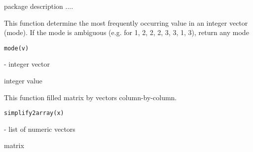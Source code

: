 \documentclass[letterpaper]{book}
\begin{document}
%
\begin{Description}\relax
package description ....
\end{Description}
%
\begin{Description}\relax
This function determine the most frequently occurring value in an integer vector (mode). If the mode is ambiguous (e.g. for 1, 2, 2, 2, 3, 3, 1, 3), return any mode
\end{Description}
%
\begin{Usage}
\begin{verbatim}
mode(v)
\end{verbatim}
\end{Usage}
%
\begin{Arguments}
\begin{ldescription}
\item[\code{v}] - integer vector
\end{ldescription}
\end{Arguments}
%
\begin{Value}
integer value
\end{Value}
%
\begin{Description}\relax
This function filled  matrix by vectors column-by-column.
\end{Description}
%
\begin{Usage}
\begin{verbatim}
simplify2array(x)
\end{verbatim}
\end{Usage}
%
\begin{Arguments}
\begin{ldescription}
\item[\code{x}] - list of numeric vectors
\end{ldescription}
\end{Arguments}
%
\begin{Value}
matrix
\end{Value}
\printindex{}
\end{document}
